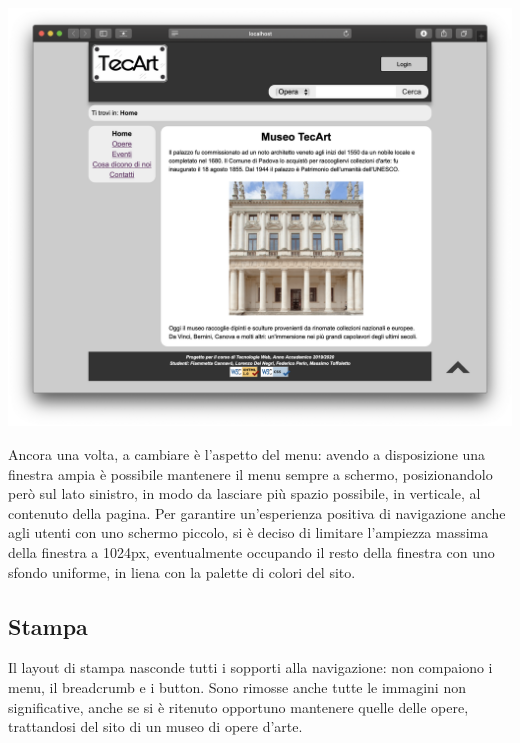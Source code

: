 \begin{center}
	\includegraphics[width=\textwidth]{img/Desktop-pres}
\end{center}
Ancora una volta, a cambiare è l'aspetto del menu: avendo a disposizione una finestra ampia è possibile mantenere il menu sempre a schermo, posizionandolo però sul lato sinistro, in modo da lasciare più spazio possibile, in verticale, al contenuto della pagina. Per garantire un'esperienza positiva di navigazione anche agli utenti con uno schermo piccolo, si è deciso di limitare l'ampiezza massima della finestra a 1024px, eventualmente occupando il resto della finestra con uno sfondo uniforme, in liena con la palette di colori del sito.


\subsection{Stampa}
\label{presentazione-stampa}


Il layout di stampa nasconde tutti i sopporti alla navigazione: non compaiono i menu, il breadcrumb e i button. Sono rimosse anche tutte le immagini non significative, anche se si è ritenuto opportuno mantenere quelle delle opere, trattandosi del sito di un museo di opere d'arte.
